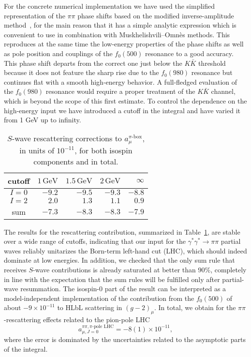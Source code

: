 \documentclass[epj]{webofc}
\newcommand{\GeV}{\,\text{GeV}}
\newcommand{\<}{\langle}
\renewcommand{\>}{\rangle}
\begin{document}
For the concrete numerical implementation we have used the simplified
representation of the $\pi\pi$ phase
shifts based on the modified inverse-amplitude
method~\cite{GomezNicola:2007qj}, for the main reason that it has a
  simple analytic expression which is convenient to use in combination with
  Muskhelishvili--Omn\`es methods. This reproduces at the same time
  the low-energy properties of the phase shifts as well as pole  
position and couplings of the $f_0(500)$ resonance to a good accuracy. This
phase shift departs from the correct one just below the $K\bar K$ threshold
because it does not feature the sharp rise due to the $f_0(980)$ resonance
but continues flat with a smooth high-energy behavior. A full-fledged 
evaluation of the $f_0(980)$ resonance would require a proper treatment of
the $K\bar K$ channel, which is beyond the scope of this first estimate.
To control the dependence on the high-energy input we have introduced a
cutoff in the integral and have varied it from 1 GeV up to infinity.

\begin{table}[t]
\renewcommand{\arraystretch}{1.3}
\centering
\begin{tabular}{crrrr}
\hline
cutoff & $1\GeV$ & $1.5\GeV$ & $2\GeV$ & $\infty$\\ 
\hline
$I=0$ & $-9.2$ & $-9.5$ & $-9.3$ & $-8.8$\\
$I=2$ & $2.0$ & $1.3$ & $1.1$ & $0.9$\\
sum & $-7.3$ & $-8.3$ & $-8.3$ & $-7.9$\\
\hline
\end{tabular}
\caption{$S$-wave rescattering corrections to $a_\mu^{\pi\text{-box}}$, in units of $10^{-11}$, for both isospin components and in total.}
\label{tab:rescatt}
\end{table}

The results for the rescattering contribution, summarized in
Table~\ref{tab:rescatt}, are stable over a wide range of cutoffs,
indicating that our input for the $\gamma^*\gamma^*\to\pi\pi$ partial waves
reliably unitarizes the Born-term left-hand cut (LHC), which should indeed
dominate at low energies. In addition, we checked that the only sum rule
that receives $S$-wave contributions is already saturated at better than
$90\%$, completely in line with the expectation that the sum rules will be
fulfilled only after partial-wave resummation. The isospin-$0$ part of the
result can be interpreted as a model-independent implementation of the
contribution from  
the $f_0(500)$ of about
$-9\times 10^{-11}$ to HLbL scattering in $(g-2)_\mu$. In total, we obtain
for the $\pi\pi$-rescattering effects related to the pion-pole LHC 
\begin{equation}
\label{amupipi}
a_{\mu,J=0}^{\pi\pi,\pi\text{-pole LHC}}=-8(1)\times 10^{-11},
\end{equation}
where the error is dominated by the uncertainties related to the asymptotic
parts of the integral. 
\end{document}
